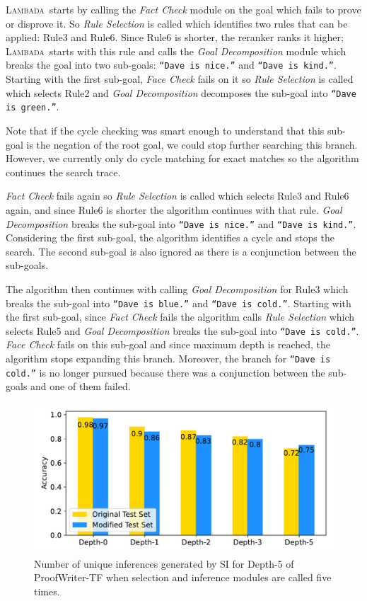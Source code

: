 \documentclass[11pt]{article}
\newcommand{\algo}{\textsc{Lambada}}
\newcommand{\module}[1]{\emph{#1}}
\begin{document}
\algo\ starts by calling the \module{Fact Check} module on the goal which fails to prove or disprove it. So \module{Rule Selection} is called which identifies two rules that can be applied: Rule3 and Rule6. Since Rule6 is shorter, the reranker ranks it higher; \algo\ starts with this rule and calls the \module{Goal Decomposition} module which breaks the goal into two sub-goals: \texttt{``Dave is nice.''} and \texttt{``Dave is kind.''}. Starting with the first sub-goal, \module{Face Check} fails on it so \module{Rule Selection} is called which selects Rule2 and \module{Goal Decomposition} decomposes the sub-goal into \texttt{``Dave is green.''}. 

Note that if the cycle checking was smart enough to understand that this sub-goal is the negation of the root goal, we could stop further searching this branch. However, we currently only do cycle matching for exact matches so the algorithm continues the search trace.

\module{Fact Check} fails again so \module{Rule Selection} is called which selects Rule3 and Rule6 again, and since Rule6 is shorter the algorithm continues with that rule. \module{Goal Decomposition} breaks the sub-goal into \texttt{``Dave is nice.''} and \texttt{``Dave is kind.''}. Considering the first sub-goal, the algorithm identifies a cycle and stops the search. The second sub-goal is also ignored as there is a conjunction between the sub-goals.

The algorithm then continues with calling \module{Goal Decomposition} for Rule3 which breaks the sub-goal into \texttt{``Dave is blue.''} and \texttt{``Dave is cold.''}. Starting with the first sub-goal, since \module{Fact Check} fails the algorithm calls \module{Rule Selection} which selects Rule5 and \module{Goal Decomposition} breaks the sub-goal into \texttt{``Dave is cold.''}. \module{Face Check} fails on this sub-goal and since maximum depth is reached, the algorithm stops expanding this branch. Moreover, the branch for \texttt{``Dave is cold.''} is no longer pursued because there was a conjunction between the sub-goals and one of them failed.

\begin{figure}[t]
  \centering
  \includegraphics[width=\columnwidth]{sensitivity.pdf}
  \caption{%
  \label{fig:sensitivity} %
    Number of unique inferences generated by SI for Depth-5 of ProofWriter-TF when selection and inference modules are called five times.
  }
\end{figure}
\end{document}
